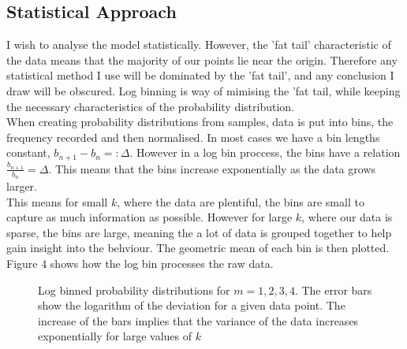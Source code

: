 \documentclass[]{article}
\begin{document}
\subsection{Statistical Approach}
I wish to analyse the model statistically. However, the 'fat tail' characteristic of the data means that the majority of our points lie near the origin. Therefore any statistical method I use will be dominated by the 'fat tail', and any conclusion I draw will be obscured. Log binning is way of mimising the 'fat tail, while keeping the necessary characteristics of the probability distribution.\\
When creating probability distributions from samples, data is put into bins, the frequency recorded and then normalised. In most cases we have a bin lengths constant, $b_{n+1}-b_{n}=:\Delta$. However in a log bin proccess, the bins have a relation $\frac{b_{n+1}}{b_n}=\Delta$. This means that the bins increase exponentially as the data grows larger. \\
This means for small $k$, where the data are plentiful, the bins are small to capture as much information as possible. However for large $k$,  where our data is sparse, the bins are large, meaning the a lot of data is grouped together to help gain insight into the behviour. The geometric mean of each bin is then plotted. Figure 4 shows how the log bin processes the raw data.
 \begin{figure}[H]
  		\baselineskip
  		\caption{Log binned probability distributions for $m=1,2,3,4$. The error bars show the logarithm of the deviation for a given data point. The increase of the bars implies that the variance of the data increases exponentially for large values of $k$}	 	
   \end{figure}
\end{document}
